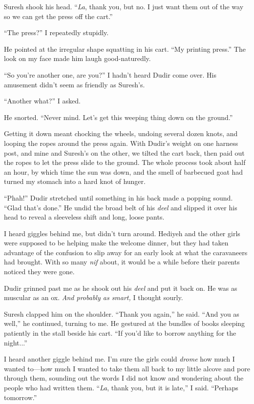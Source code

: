 Suresh shook his head.  ``\emph{La}, thank you, but no.  I just want them
out of the way so we can get the press off the cart.''

``The press?'' I repeatedly stupidly.

He pointed at the irregular shape squatting in his cart.  ``My printing
press.''  The look on my face made him laugh good-naturedly.

``So you're another one, are you?'' I hadn't heard Dudir come over.  His
amusement didn't seem as friendly as Suresh's.

``Another what?'' I asked.

He snorted.  ``Never mind.  Let's get this weeping thing down on the
ground.''

Getting it down meant chocking the wheels, undoing several dozen
knots, and looping the ropes around the press again.  With Dudir's
weight on one harness post, and mine and Suresh's on the other, we
tilted the cart back, then paid out the ropes to let the press slide
to the ground.  The whole process took about half an hour, by which
time the sun was down, and the smell of barbecued goat had turned my
stomach into a hard knot of hunger.

``Phah!''  Dudir stretched until something in his back made a popping
sound.  ``Glad that's done.''  He undid the broad belt of his \emph{deel} and
slipped it over his head to reveal a sleeveless shift and long, loose
pants.

I heard giggles behind me, but didn't turn around. Hediyeh and the
other girls were supposed to be helping make the welcome dinner, but
they had taken advantage of the confusion to slip away for an early
look at what the caravaneers had brought.  With so many \emph{nif} about,
it would be a while before their parents noticed they were gone.

Dudir grinned past me as he shook out his \emph{deel} and put it back on.
He was as muscular as an ox.  \emph{And probably as smart,} I thought
sourly.

Suresh clapped him on the shoulder.  ``Thank you again,'' he said.  ``And
you as well,'' he continued, turning to me.  He gestured at the bundles
of books sleeping patiently in the stall beside his cart.  ``If you'd
like to borrow anything for the night...''

I heard another giggle behind me.  I'm sure the girls could \emph{drome}
how much I wanted to---how much I wanted to take them all back to my
little alcove and pore through them, sounding out the words I did not
know and wondering about the people who had written them.  ``\emph{La},
thank you, but it is late,'' I said.  ``Perhaps tomorrow.''

